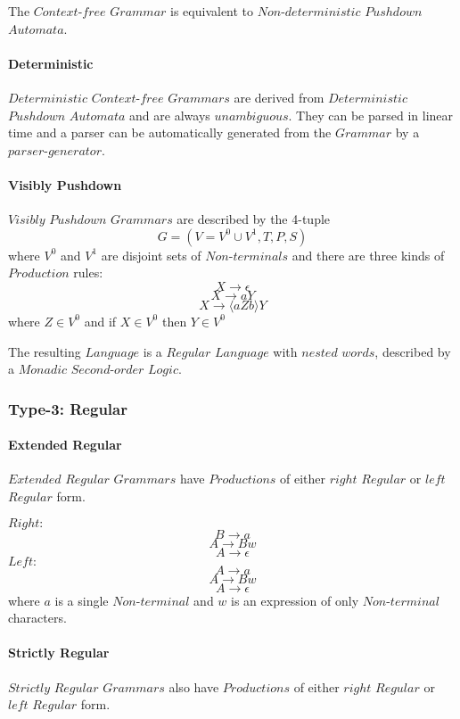\documentclass{article}
\begin{document}
    The $Context$-$free$ $Grammar$ is equivalent to
    $Non$-$deterministic$ $Pushdown$ $Automata$.

    \paragraph{Deterministic}
    $Deterministic$ $Context$-$free$ $Grammars$ are derived from
    $Deterministic$ $Pushdown$ $Automata$ and are always
    $unambiguous$. They can be parsed in linear time and a parser can
    be automatically generated from the $Grammar$ by a
    $parser$-$generator$.

    \paragraph{Visibly Pushdown}
    $Visibly$ $Pushdown$ $Grammars$ are described by the 4-tuple
    \[
        G = (V=V^0 \cup V^1,T,P,S)
    \]
    where $V^0$ and $V^1$ are disjoint sets of $Non$-$terminals$ and
    there are three kinds of $Production$ rules:
    \[
        X \rightarrow \epsilon
    \]\[
        X \rightarrow aY
    \]\[
        X \rightarrow \langle aZb \rangle Y
    \]
    where $Z \in V^0$ and if $X \in V^0$ then $Y \in V^0$

    The resulting $Language$ is a $Regular$ $Language$ with $nested$
    $words$, described by a $Monadic$ $Second$-$order$ $Logic$.

\subsubsection{Type-3: Regular}

    \paragraph{Extended Regular}
    $Extended$ $Regular$ $Grammars$ have $Productions$ of either
    $right$ $Regular$ or $left$ $Regular$ form.

    $Right:$
    \[
        B \rightarrow a
    \]\[
        A \rightarrow Bw
    \]\[
        A \rightarrow \epsilon
    \]
    $Left:$
    \[
        A \rightarrow a
    \]\[
        A \rightarrow Bw
    \]\[
        A \rightarrow \epsilon
    \]
    where $a$ is a single $Non$-$terminal$ and $w$ is an expression of
    only $Non$-$terminal$ characters.

    \paragraph{Strictly Regular}
    $Strictly$ $Regular$ $Grammars$ also have $Productions$ of either
    $right$ $Regular$ or $left$ $Regular$ form.
\end{document}
